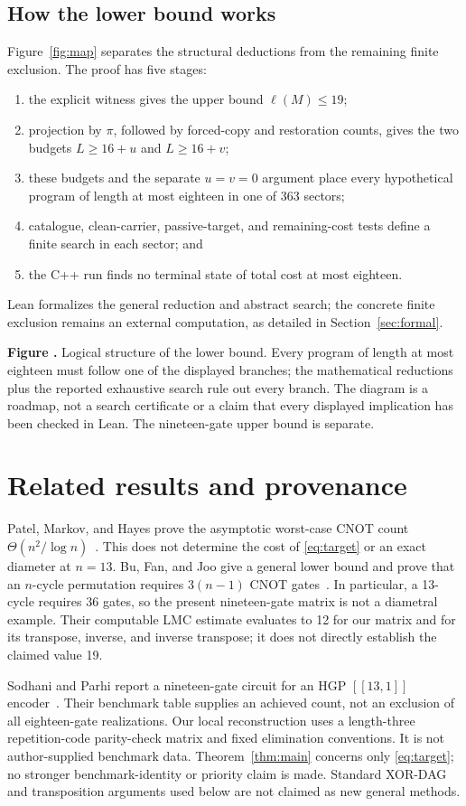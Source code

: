 \documentclass[11pt]{article}
\newcommand{\cost}{\ell}
\newcommand{\prooffigure}[3]{%
  \begin{center}
  \begin{minipage}{.98\linewidth}
  \centering
  \resizebox{\linewidth}{!}{}\par
  \refstepcounter{figure}\label{#2}%
  \small\textbf{Figure \thefigure.} #3
  \end{minipage}
  \end{center}}
\begin{document}
\subsection{How the lower bound works}
Figure~\ref{fig:map} separates the structural deductions from the remaining
finite exclusion. The proof has five stages:
\begin{enumerate}
\item the explicit witness gives the upper bound $\cost(M)\le19$;
\item projection by $\pi$, followed by forced-copy and restoration counts,
gives the two budgets $L\ge16+u$ and $L\ge16+v$;
\item these budgets and the separate $u=v=0$ argument place every
hypothetical program of length at most eighteen in one of 363 sectors;
\item catalogue, clean-carrier, passive-target, and remaining-cost tests
define a finite search in each sector; and
\item the C++ run finds no terminal state of total cost at most eighteen.
\end{enumerate}
Lean formalizes the general reduction and abstract search; the concrete
finite exclusion remains an external computation, as detailed in
Section~\ref{sec:formal}.
\prooffigure{proof_map}{fig:map}{Logical structure of the lower bound.
Every program of length at most eighteen must follow one of the displayed
branches; the mathematical reductions plus the reported exhaustive search
rule out every branch. The diagram is a roadmap, not a search certificate or
a claim that every displayed implication has been checked in Lean. The
nineteen-gate upper bound is separate.}

\section{Related results and provenance}
Patel, Markov, and Hayes prove the asymptotic worst-case CNOT count
$\Theta(n^2/\log n)$~\cite{pmh}. This does not determine the cost of
\eqref{eq:target} or an exact diameter at $n=13$.
Bu, Fan, and Joo give a general lower bound and prove that an $n$-cycle
permutation requires $3(n-1)$ CNOT gates~\cite{bfj}. In particular, a
13-cycle requires 36 gates, so the present nineteen-gate matrix is not a
diametral example. Their computable LMC estimate evaluates to 12 for our
matrix and for its transpose, inverse, and inverse transpose; it does not
directly establish the claimed value 19.

Sodhani and Parhi report a nineteen-gate circuit for an HGP $[[13,1]]$
encoder~\cite{sp}. Their benchmark table supplies an achieved count, not
an exclusion of all eighteen-gate realizations. Our local reconstruction
uses a length-three repetition-code parity-check matrix and fixed
elimination conventions. It is not author-supplied benchmark data.
Theorem~\ref{thm:main} concerns only \eqref{eq:target}; no stronger
benchmark-identity or priority claim is made. Standard XOR-DAG and
transposition arguments used below are not claimed as new general methods.
\end{document}
